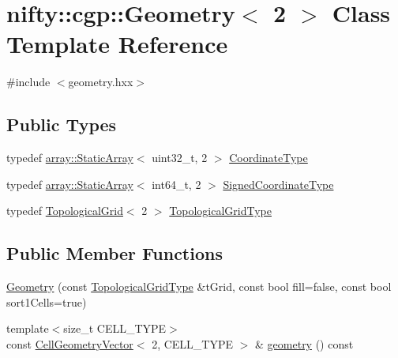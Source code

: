 \hypertarget{classnifty_1_1cgp_1_1Geometry_3_012_01_4}{}\section{nifty\+:\+:cgp\+:\+:Geometry$<$ 2 $>$ Class Template Reference}
\label{classnifty_1_1cgp_1_1Geometry_3_012_01_4}


{\ttfamily \#include $<$geometry.\+hxx$>$}

\subsection*{Public Types}
\begin{DoxyCompactItemize}
\item 
typedef \hyperlink{namespacenifty_1_1array_a683f151f19c851754e0c6d55ed16a0c2}{array\+::\+Static\+Array}$<$ uint32\+\_\+t, 2 $>$ \hyperlink{classnifty_1_1cgp_1_1Geometry_3_012_01_4_ab8abca4eea1550f59dca20f28bd0304d}{Coordinate\+Type}
\item 
typedef \hyperlink{namespacenifty_1_1array_a683f151f19c851754e0c6d55ed16a0c2}{array\+::\+Static\+Array}$<$ int64\+\_\+t, 2 $>$ \hyperlink{classnifty_1_1cgp_1_1Geometry_3_012_01_4_a2a2413f5135f7b297a4f703cb5bcb641}{Signed\+Coordinate\+Type}
\item 
typedef \hyperlink{classnifty_1_1cgp_1_1TopologicalGrid}{Topological\+Grid}$<$ 2 $>$ \hyperlink{classnifty_1_1cgp_1_1Geometry_3_012_01_4_a6f4a07a376a645097547311fe0ad2836}{Topological\+Grid\+Type}
\end{DoxyCompactItemize}
\subsection*{Public Member Functions}
\begin{DoxyCompactItemize}
\item 
\hyperlink{classnifty_1_1cgp_1_1Geometry_3_012_01_4_a3fa2454e7e2c5a134441928d5907c9dd}{Geometry} (const \hyperlink{classnifty_1_1cgp_1_1Geometry_3_012_01_4_a6f4a07a376a645097547311fe0ad2836}{Topological\+Grid\+Type} \&t\+Grid, const bool fill=false, const bool sort1\+Cells=true)
\item 
{\footnotesize template$<$size\+\_\+t C\+E\+L\+L\+\_\+\+T\+Y\+PE$>$ }\\const \hyperlink{classnifty_1_1cgp_1_1CellGeometryVector}{Cell\+Geometry\+Vector}$<$ 2, C\+E\+L\+L\+\_\+\+T\+Y\+PE $>$ \& \hyperlink{classnifty_1_1cgp_1_1Geometry_3_012_01_4_a74c6ca2e29fb745a6ee5d565553f0e44}{geometry} () const
\end{DoxyCompactItemize}


